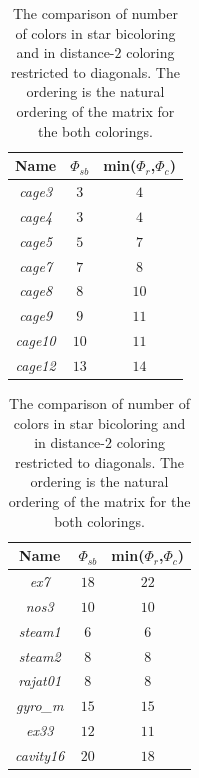 \documentclass[11pt, twoside,a4paper]{book}
\begin{document}
\begin{table}
\centering
\begin{tabular}{|c|c|c|}
\hline
Name & $\Phi_{sb}$ & min($\Phi_r$,$\Phi_c$)\\\hline
\textit{cage3} & $3$ & $4$\\\hline
\textit{cage4} & $3$ & $4$ \\\hline
\textit{cage5} & $5$ & $7$\\\hline
\textit{cage7} & $7$  & $8$\\\hline
\textit{cage8} & $8$  & $10$\\\hline
\textit{cage9} & $9$  & $11$\\\hline
\textit{cage10} & $10$ & $11$\\\hline
\textit{cage12} & $13$ &  $14$\\\hline
\end{tabular}
\hfill
\begin{tabular}{|c|c|c|}
\hline
Name & $\Phi_{sb}$ & min($\Phi_r$,$\Phi_c$)\\\hline
\textit{ex7} & $18$ & $22$ \\\hline
\textit{nos3} & $10$ & $10$ \\\hline
\textit{steam1} & $6$ & $6$ \\\hline
\textit{steam2} & $8$ & $8$ \\\hline
\textit{rajat01} & $8$ & $8$ \\\hline
\textit{gyro\_m} & $15$ & $15$\\\hline
\textit{ex33} & $12$ & $11$\\\hline
\textit{cavity16} & $20$ & $18$ \\\hline
\end{tabular}

\caption{The comparison of number of colors in star bicoloring and in
distance-$2$ coloring restricted to diagonals.
The ordering is the natural ordering of the matrix for the both colorings.
}
\label{table.starbic.d2.diag}
\end{table}
\end{document}
